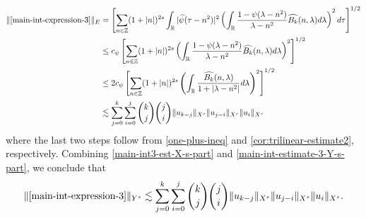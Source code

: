 \documentclass[12pt,reqno]{amsart}
\numberwithin{equation}{section}  %
\numberwithin{figure}{section}
\newcommand{\rr}{\mathbb{R}}
\newcommand{\zz}{\mathbb{Z}}
\newcommand{\wh}{\widehat}
\theoremstyle{plain}
\theoremstyle{definition}
\theoremstyle{remark}
\begin{document}
\begin{equation}
  \label{main-int-estimate-3-Y-s-part}
  \begin{split}
    \|\eqref{main-int-expression-3}\|_{E}
    & = \left[ \sum_{n \in \zz} (1 + | n |)^{2s} \int_{\rr} |
    \wh{\psi}(\tau - n^{2}) |^{2} \left( \int_{\rr}\frac{1 - \psi(\lambda -
    n^{2})}{\lambda - n^{2}} \wh{{B_k}}(n, \lambda) d \lambda \right)^{2} d \tau
    \right]^{1/2}
    \\
    & \le c_{\psi} \left[ \sum_{n \in \zz} (1 + | n |)^{2s} \left(
    \int_{\rr} \frac{1 - \psi(\lambda - n^{2})}{\lambda - n^{2}}
    \wh{{B_k}}(n, \lambda) d \lambda
    \right)^{2}\right]^{1/2}
    \\
    & \le 2 c_{\psi} \left[ \sum_{n \in \zz} (1 + | n |)^{2s} \left(
    \int_{\rr} \frac{\wh{{B_k}}(n, \lambda) }{1 + |\lambda - n^{2}|}
    d \lambda
    \right)^{2}\right]^{1/2}
    \\
    & \lesssim 
    \sum_{j=0}^{k} \sum_{i=0}^{j} {k \choose j}{j \choose i}
    \|u_{k-j}\|_{X^s} \| u_{j-i}\|_{X^s}
    \| u_i \|_{X^s}
  \end{split}
\end{equation}
%
%
where the last two steps follow from \eqref{one-plus-ineq} and
\cref{cor:trilinear-estimate2}, respectively. Combining
\eqref{main-int3-est-X-s-part} and \eqref{main-int-estimate-3-Y-s-part}, we
conclude that
%
%
\begin{equation}
  \label{main-int3-est}
  \begin{split}
    \|\eqref{main-int-expression-3}\|_{Y^s} 
    \lesssim \sum_{j=0}^{k} \sum_{i=0}^{j} {k \choose j}{j \choose i}
    \|u_{k-j}\|_{X^s} \| u_{j-i}\|_{X^s}
    \| u_i \|_{X^s}.
  \end{split}
\end{equation}
%
%
%
\end{document}
